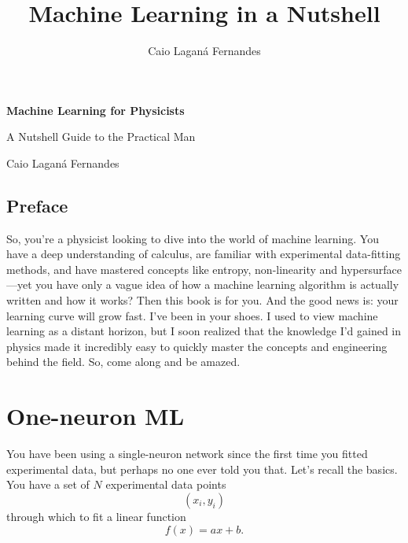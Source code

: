 \documentclass[11pt,a4paper,oneside]{book}
\title{Machine Learning in a Nutshell}
\author{Caio Laganá Fernandes}
\date{}
\theoremstyle{definition}
\theoremstyle{plain}
\theoremstyle{remark}
\begin{document}
\frontmatter

\thispagestyle{empty}

\begin{center}
  {\Huge\bfseries Machine Learning for Physicists\par}
  \vspace{0.6em}
  {\Large A Nutshell Guide to the Practical Man\par}
  \vspace{1.5em}
  {\large Caio Laganá Fernandes\par}
\end{center}

\vspace{2.5em}

\section*{Preface}

So, you're a physicist looking to dive into the world of machine learning. You have a deep understanding of calculus, are familiar with experimental data-fitting methods, and have mastered concepts like entropy, non-linearity and hypersurface---yet you have only a vague idea of how a machine learning algorithm is actually written and how it works? Then this book is for you. And the good news is: your learning curve will grow fast. I've been in your shoes. I used to view machine learning as a distant horizon, but I soon realized that the knowledge I'd gained in physics made it incredibly easy to quickly master the concepts and engineering behind the field. So, come along and be amazed.

\cleardoublepage
\mainmatter

\chapter{One-neuron ML}
\label{chap:single-neuron}



You have been using a single-neuron network since the first time you fitted experimental data, but perhaps no one ever told you that. Let's recall the basics. You have a set of $N$ experimental data points
\begin{equation}
    \label{eq:xy-dataset}
    (x_i,y_i)
\end{equation}
through which to fit a linear function
\begin{equation}
    \label{eq:linear-activation}
    f(x)=ax+b.
\end{equation}
\end{document}
